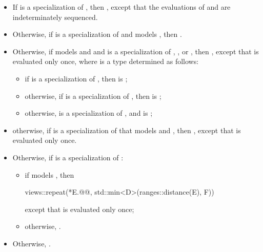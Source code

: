 \begin{itemize}
\item
If  is a specialization
of ,
then ,
except that the evaluations of  and 
are indeterminately sequenced.

\item
Otherwise, if  is a specialization of
 and  models ,
then .
\item
Otherwise, if  models
 and 
and is a specialization of
,
, or
,
then
,
except that  is evaluated only once,
where  is a type determined as follows:

\begin{itemize}
\item if  is a specialization of ,
then  is ;
\item otherwise, if  is a specialization of ,
then  is ;
\item otherwise,  is a specialization of , and
 is ;
\end{itemize}

\item
otherwise, if  is
a specialization of 
that models  and ,
then
,
except that  is evaluated only once.

\item
Otherwise, if  is
a specialization of :
\begin{itemize}
\item
if  models ,
then
\begin{codeblock}
views::repeat(*E.@@, std::min<D>(ranges::distance(E), F))
\end{codeblock}
except that  is evaluated only once;
\item
otherwise, .
\end{itemize}

\item
Otherwise, .
\end{itemize}

